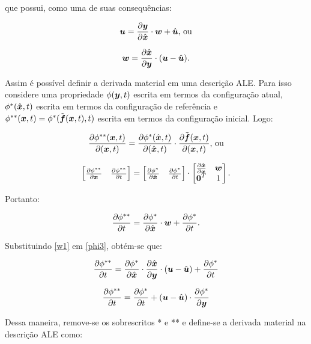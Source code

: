 \noindent que possui, como uma de suas consequências:

\begin{equation}
    \BB{u}=\der{\BB{y}}{\HBB{x}}\cdot\BB{w}+\uhat\text{, ou}
    \label{u1}
\end{equation}

\begin{equation}
    \BB{w}=\der{\HBB{x}}{\BB{y}}\cdot(\BB{u}-\uhat)\text{.}
    \label{w1}
\end{equation}

Assim é possível definir a derivada material em uma descrição ALE. Para isso considere uma propriedade $\phi(\boldsymbol{y},t)$ escrita em termos da configuração atual, $\phi^*(\hat{\boldsymbol{x}},t)$ escrita em termos da configuração de referência e $\phi^{**}(\boldsymbol{x},t)=\phi^*(\tilde{\boldsymbol{f}}(\boldsymbol{x},t),t)$ escrita em termos da configuração inicial. Logo:

\begin{equation}
    \der{\phi^{**}(\BB{x},t)}{(\BB{x},t)}=\der{\phi^*(\HBB{x},t)}{(\HBB{x},t)}\cdot\der{\TBB{f}(\BB{x},t)}{(\BB{x},t)}\text{, ou}
    \label{phi1}
\end{equation}

\begin{equation}
    \begin{bmatrix}\der{\phi^{**}}{\BB{x}}&\der{\phi^{**}}{t}\end{bmatrix}=
    \begin{bmatrix}\der{\phi^{*}}{\HBB{x}}&\der{\phi^{*}}{t}\end{bmatrix}\cdot
    \begin{bmatrix}\der{\HBB{x}}{\BB{x}}&\BB{w}\\\BB{0}^T&1\end{bmatrix}
    \text{.}
    \label{phi2}
\end{equation}

\noindent Portanto:

\begin{equation}
    \der{\phi^{**}}{t}=\der{\phi^{*}}{\HBB{x}}\cdot\BB{w}+\der{\phi^{*}}{t}\text{.}
    \label{phi3}
\end{equation}

Substituindo \ref{w1} em \ref{phi3}, obtém-se que:

\[\frac{\partial{\phi^{**}}}{\partial{t}}=\frac{\partial{\phi^{*}}}{\partial{\hat{\boldsymbol{x}}}}\cdot\frac{\partial{\hat{\boldsymbol{x}}}}{\partial{\boldsymbol{y}}}\cdot(\boldsymbol{u}-\hat{\boldsymbol{u}})+\frac{\partial{\phi^{*}}}{\partial{t}}\]

\[\frac{\partial{\phi^{**}}}{\partial{t}}=\frac{\partial{\phi^{*}}}{\partial{t}}+(\boldsymbol{u}-\hat{\boldsymbol{u}})\cdot\frac{\partial{\phi^{*}}}{\partial{\boldsymbol{y}}}\]

Dessa maneira, remove-se os sobrescritos * e ** e define-se a derivada material na descrição ALE como:

